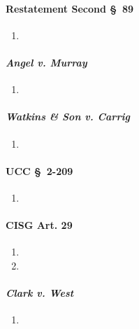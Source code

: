 \paragraph{Restatement Second \S\ 89}

\begin{enumerate}
    \item %
\end{enumerate}

\paragraph{\emph{Angel v. Murray}}

\begin{enumerate}
    \item %
\end{enumerate}

\paragraph{\emph{Watkins \& Son v. Carrig}}

\begin{enumerate}
    \item %
\end{enumerate}

\paragraph{UCC \S\ 2-209}

\begin{enumerate}
    \item %
\end{enumerate}

\paragraph{CISG Art. 29}

\begin{enumerate}
    \item %
    \item %
\end{enumerate}

\paragraph{\emph{Clark v. West}}

\begin{enumerate}
    \item %
\end{enumerate}

